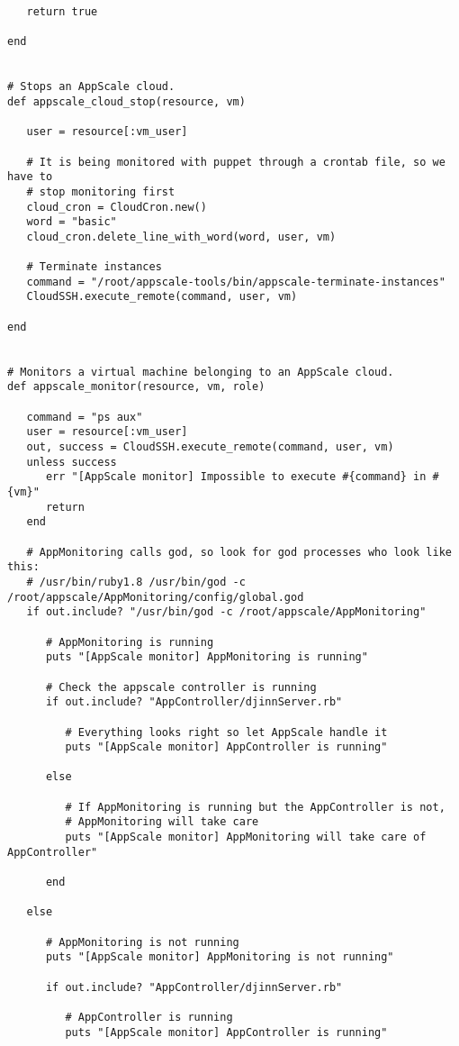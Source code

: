 \begin{lstlisting}
   return true
   
end


# Stops an AppScale cloud.
def appscale_cloud_stop(resource, vm)
   
   user = resource[:vm_user]
   
   # It is being monitored with puppet through a crontab file, so we have to
   # stop monitoring first
   cloud_cron = CloudCron.new()
   word = "basic"
   cloud_cron.delete_line_with_word(word, user, vm)
   
   # Terminate instances
   command = "/root/appscale-tools/bin/appscale-terminate-instances"
   CloudSSH.execute_remote(command, user, vm)
   
end


# Monitors a virtual machine belonging to an AppScale cloud.
def appscale_monitor(resource, vm, role)

   command = "ps aux"
   user = resource[:vm_user]
   out, success = CloudSSH.execute_remote(command, user, vm)
   unless success
      err "[AppScale monitor] Impossible to execute #{command} in #{vm}"
      return
   end
   
   # AppMonitoring calls god, so look for god processes who look like this:
   # /usr/bin/ruby1.8 /usr/bin/god -c /root/appscale/AppMonitoring/config/global.god
   if out.include? "/usr/bin/god -c /root/appscale/AppMonitoring"
   
      # AppMonitoring is running
      puts "[AppScale monitor] AppMonitoring is running"

      # Check the appscale controller is running
      if out.include? "AppController/djinnServer.rb"
         
         # Everything looks right so let AppScale handle it
         puts "[AppScale monitor] AppController is running"
      
      else
         
         # If AppMonitoring is running but the AppController is not,
         # AppMonitoring will take care
         puts "[AppScale monitor] AppMonitoring will take care of AppController"
         
      end

   else
   
      # AppMonitoring is not running
      puts "[AppScale monitor] AppMonitoring is not running"
   
      if out.include? "AppController/djinnServer.rb"

         # AppController is running
         puts "[AppScale monitor] AppController is running"
         

\end{lstlisting}

